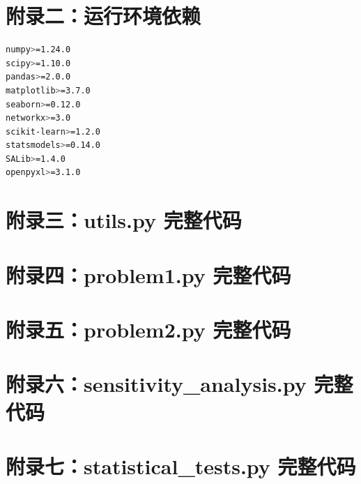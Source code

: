 \documentclass[12pt,a4paper]{article}
\begin{document}
\section*{附录二：运行环境依赖}
\begin{lstlisting}[language=bash, caption={requirements.txt}]
numpy>=1.24.0
scipy>=1.10.0
pandas>=2.0.0
matplotlib>=3.7.0
seaborn>=0.12.0
networkx>=3.0
scikit-learn>=1.2.0
statsmodels>=0.14.0
SALib>=1.4.0
openpyxl>=3.1.0
\end{lstlisting}

\section*{附录三：utils.py 完整代码}

\section*{附录四：problem1.py 完整代码}

\section*{附录五：problem2.py 完整代码}

\section*{附录六：sensitivity\_analysis.py 完整代码}

\section*{附录七：statistical\_tests.py 完整代码}
\end{document}
